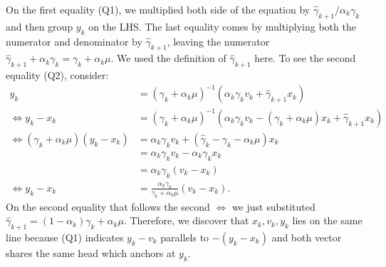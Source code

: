 \documentclass[12pt]{article}
\begin{document}
        On the first equality (Q1), we multiplied both side of the equation by $\hat\gamma_{k + 1}/\alpha_k \gamma_k$ and then group $y_k$ on the LHS. 
        The last equality comes by multiplying both the numerator and denominator by $\hat \gamma_{k + 1}$, leaving the numerator $\hat \gamma_{k + 1} + \alpha_k \gamma_k = \gamma_k + \alpha_k \mu$. 
        We used the definition of $\hat \gamma_{k + 1}$ here. 
        To see the second equality (Q2), consider: 
        \begin{align*}
            y_k &= (\gamma_k + \alpha_k \mu)^{-1}(\alpha_k \gamma_k v_k + \hat\gamma_{k + 1} x_k)
            \\
            \iff
            y_k - x_k &= 
            (\gamma_k + \alpha_k \mu)^{-1}
            (\alpha_k \gamma_k v_k - (\gamma_k + \alpha_k \mu)x_k + \hat \gamma_{k + 1} x_k)
            \\
            \iff 
            (\gamma_k + \alpha_k \mu)(y_k - x_k)
            &= 
            \alpha_k\gamma _kv_k + 
            (\hat \gamma_k - \gamma_k - \alpha_k \mu) x_k
            \\
            &= \alpha_k \gamma_k v_k - \alpha_k \gamma_k x_k 
            \\
            &= \alpha_k \gamma_k(v_k - x_k)
            \\
            \iff 
            y_k - x_k &= 
            \frac{\alpha_k \gamma_k}{\gamma_k + \alpha_k \mu}(v_k - x_k). 
        \end{align*}
        On the second equality that follows the second $\iff$ we just substituted $\hat\gamma_{k + 1} = (1 - \alpha_k)\gamma_k + \alpha_k \mu$. 
        Therefore, we discover that $x_k, v_k, y_k$ lies on the same line because (Q1) indicates $y_k - v_k$ parallels to $-(y_k - x_k)$ and both vector shares the same head which anchors at $y_k$. 
    
\end{document}
